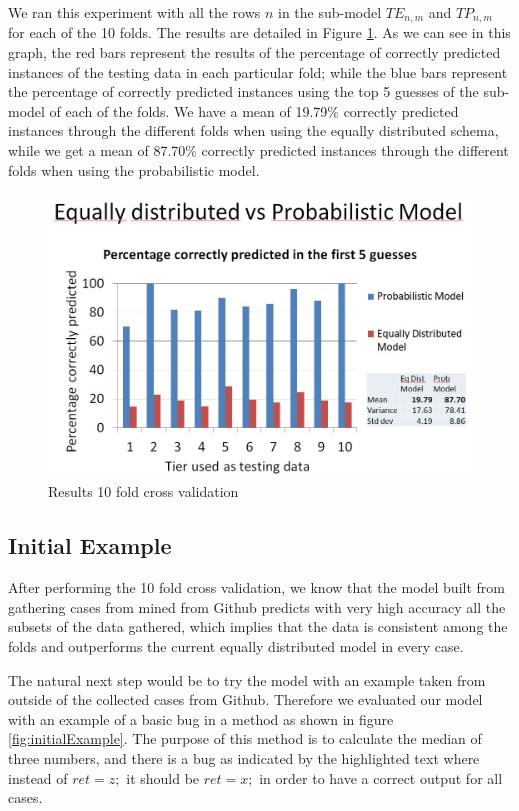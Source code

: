 \documentclass[conference]{IEEEtran}
\begin{document}
We ran this experiment with all the rows $n$ in the sub-model $TE_{n,m}$ and 
$TP_{n,m}$ for each of the 10 
folds. The results are detailed in Figure \ref{fig:results10fcv}. As we can see 
in this graph, the red bars represent the results of the percentage of correctly 
predicted instances of the testing data in each particular fold; while the blue 
bars represent the percentage of correctly predicted instances using the top 5 
guesses of the sub-model of each of the folds. We have a mean of 19.79\% 
correctly predicted instances through the different folds when using the equally 
distributed schema, while we get a mean of 87.70\% correctly predicted instances 
through the different folds when using the probabilistic model. 



\begin{figure}[!h]
  \centering
    \includegraphics[scale=0.33]{sanity1}
  \caption{Results 10 fold cross validation}
  \label{fig:results10fcv}
\end{figure}

\subsection{Initial Example}
After performing the 10 fold cross validation, we know that the model built from 
gathering cases from mined from Github predicts with very high accuracy all the 
subsets of the data gathered, which implies that the data is consistent among 
the folds and outperforms the current equally distributed model in every case. 

The natural next step would be to try the model with an example taken from 
outside of the collected cases from Github. Therefore we evaluated our model 
with an example of a basic bug in a method as shown in figure 
\ref{fig:initialExample}. The purpose of this method is to calculate the median 
of three numbers, and there is a bug as indicated by the highlighted text where 
instead of $ret = z;$ it should be $ret = x;$ in order to have a correct output 
for all cases.
\end{document}
